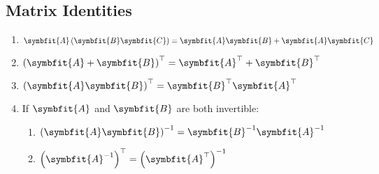 \documentclass{article}
\begin{document}
\begin{multicols*}{2}
    \section*{Matrix Identities}
    \begin{enumerate}
        \item $\symbfit{A}\left( \symbfit{B}\symbfit{C} \right) = \symbfit{A}\symbfit{B}+\symbfit{A}\symbfit{C}$
        \item $\left( \symbfit{A}+\symbfit{B} \right)^\top = \symbfit{A}^\top + \symbfit{B}^\top$
        \item $\left( \symbfit{A}\symbfit{B} \right)^\top = \symbfit{B}^\top \symbfit{A}^\top$
        \item If $\symbfit{A}$ and $\symbfit{B}$ are both invertible:
              \begin{enumerate}
                  \item $\left( \symbfit{A}\symbfit{B} \right)^{-1} = \symbfit{B}^{-1}\symbfit{A}^{-1}$
                  \item $\left( \symbfit{A}^{-1} \right)^\top = \left( \symbfit{A}^\top \right)^{-1}$
              \end{enumerate}
    \end{enumerate}
\end{multicols*}
\end{document}
